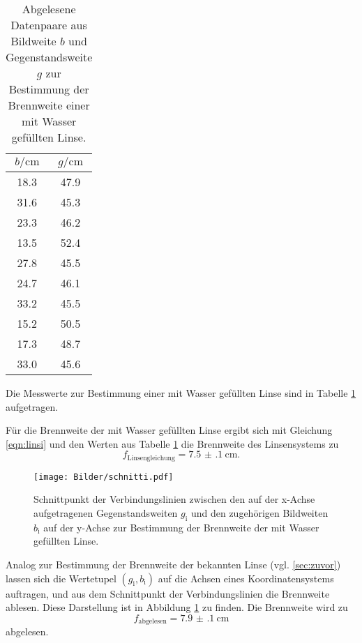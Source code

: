 \begin{table}
	\caption{Abgelesene Datenpaare aus Bildweite $b$ und Gegenstandsweite $g$ zur Bestimmung der Brennweite einer mit Wasser gefüllten Linse.}
	\label{tab:hquer}
	\centering
	\begin{tabular}{cc}
		\toprule
		$b/\si{\centi\meter}$ & $g/\si{\centi\meter}$ \\
	\midrule
		18.3 & 47.9 \\
		31.6 & 45.3 \\
		23.3 & 46.2 \\
		13.5 & 52.4 \\
		27.8 & 45.5 \\
		24.7 & 46.1 \\
		33.2 & 45.5 \\
		15.2 & 50.5 \\
		17.3 & 48.7 \\
		33.0 & 45.6 \\
	\bottomrule
	\end{tabular}
\end{table}

Die Messwerte zur Bestimmung einer mit Wasser gefüllten Linse sind in Tabelle \ref{tab:hquer}
aufgetragen.

Für die Brennweite der mit Wasser gefüllten Linse ergibt sich mit Gleichung \eqref{eqn:linsi}
und den Werten aus Tabelle \ref{tab:hquer} die Brennweite des Linsensystems zu
\begin{equation*}
	f_{\mathrm{Linsengleichung}} = \SI{7.5(1)}{\centi\meter} \mathrm{.}
\end{equation*}

\begin{figure}
  \centering
  \texttt{[image: Bilder/schnitti.pdf]}
  \caption{Schnittpunkt der Verbindungslinien zwischen den auf der x-Achse aufgetragenen Gegenstandsweiten $g_\mathrm{i}$ und den zugehörigen Bildweiten $b_\mathrm{i}$ auf der y-Achse zur Bestimmung der Brennweite der mit Wasser gefüllten Linse.}
  \label{fig:kopiert}
\end{figure}


Analog zur Bestimmung der Brennweite der bekannten Linse (vgl. \ref{sec:zuvor}) lassen sich
die Wertetupel $(g_{\mathrm{i}}, b_{\mathrm{i}})$ auf die Achsen eines Koordinatensystems
auftragen, und aus dem Schnittpunkt der Verbindungslinien die Brennweite ablesen.
Diese Darstellung  ist in Abbildung \ref{fig:kopiert} zu finden.
Die Brennweite wird zu
\begin{equation*}
	f_{\mathrm{abgelesen}} = \SI{7.9(1)}{\centi\meter}
\end{equation*}
abgelesen.




